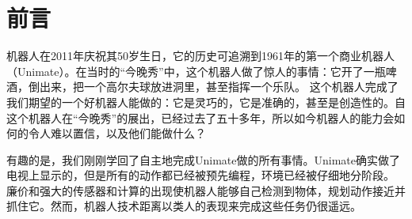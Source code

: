 \chapter{前言}\label{chap:introduction}

机器人在2011年庆祝其50岁生日，它的历史可追溯到1961年的第一个商业机器人（Unimate）。在当时的“今晚秀”中，这个机器人做了惊人的事情：它开了一瓶啤酒，倒出来，把一个高尔夫球放进洞里，甚至指挥一个乐队。 这个机器人完成了我们期望的一个好机器人能做的：它是灵巧的，它是准确的，甚至是创造性的。自这个机器人在“今晚秀”的展出，已经过去了五十多年，所以如今机器人的能力会如何的令人难以置信，以及他们能做什么？


有趣的是，我们刚刚学回了自主地完成Unimate做的所有事情。Unimate确实做了电视上显示的，但是所有的动作都已经被预先编程，环境已经被仔细地分阶段。 廉价和强大的传感器和计算的出现使机器人能够自己检测到物体，规划动作接近并抓住它。然而，机器人技术距离以类人的表现来完成这些任务仍很遥远。


